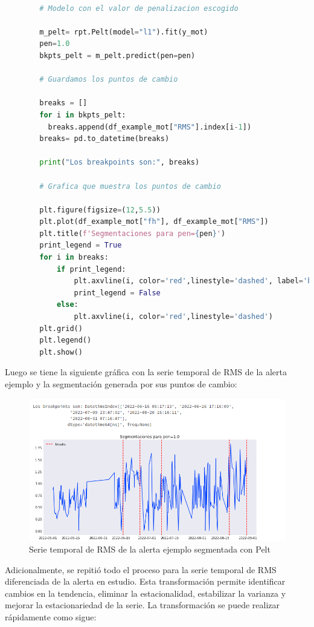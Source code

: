 \documentclass{article}[14pts]
\begin{document}
      \begin{lstlisting}[language=Python]

        # Modelo con el valor de penalizacion escogido

        m_pelt= rpt.Pelt(model="l1").fit(y_mot)
        pen=1.0
        bkpts_pelt = m_pelt.predict(pen=pen)
        
        # Guardamos los puntos de cambio

        breaks = []
        for i in bkpts_pelt:
          breaks.append(df_example_mot["RMS"].index[i-1])
        breaks= pd.to_datetime(breaks)

        print("Los breakpoints son:", breaks)

        # Grafica que muestra los puntos de cambio

        plt.figure(figsize=(12,5.5))
        plt.plot(df_example_mot["fh"], df_example_mot["RMS"])
        plt.title(f'Segmentaciones para pen={pen}')
        print_legend = True
        for i in breaks:
            if print_legend:
                plt.axvline(i, color='red',linestyle='dashed', label='breaks')
                print_legend = False
            else:
                plt.axvline(i, color='red',linestyle='dashed')
        plt.grid()
        plt.legend()
        plt.show()

      \end{lstlisting}

    Luego se tiene la siguiente gráfica con la serie temporal de RMS de la alerta ejemplo y la segmentación generada por sus puntos de cambio:

      \begin{center}
        \begin{figure}[h]
          \centering
          \includegraphics[width=.6\textwidth]{images/8.png}
          \caption{Serie temporal de RMS de la alerta ejemplo segmentada con Pelt}
        \end{figure}    
      \end{center}

    Adicionalmente, se repitió todo el proceso para la serie temporal de RMS diferenciada de la alerta en estudio. Esta transformación permite identificar cambios en la tendencia, eliminar la estacionalidad, estabilizar la varianza y mejorar la estacionariedad de la serie. La transformación se puede realizar rápidamente como sigue: 
\end{document}
